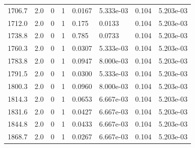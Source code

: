 \documentclass[preview]{standalone}
\begin{document}
{{{{{\begin{tabular}{L{1.2cm}C{1.2cm} C{0.3cm}C{0.5cm} C{1.4cm}C{1.4cm} C{1.4cm}C{1.4cm}}
  1706.7  &   2.0  & 0     &  1 &  0.0167  & 5.333e-03  & 0.104 &  5.203e-03   \\ 
  1712.0  &   2.0  & 0     &  1 &  0.175  & 0.0133  & 0.104 &  5.203e-03   \\ 
  1738.8  &   2.0  & 0     &  1 &  0.785  & 0.0733  & 0.104 &  5.203e-03   \\ 
  1760.3  &   2.0  & 0     &  1 &  0.0307  & 5.333e-03  & 0.104 &  5.203e-03   \\ 
  1783.8  &   2.0  & 0     &  1 &  0.0947  & 8.000e-03  & 0.104 &  5.203e-03   \\ 
  1791.5  &   2.0  & 0     &  1 &  0.0300  & 5.333e-03  & 0.104 &  5.203e-03   \\ 
  1800.3  &   2.0  & 0     &  1 &  0.0960  & 8.000e-03  & 0.104 &  5.203e-03   \\ 
  1814.3  &   2.0  & 0     &  1 &  0.0653  & 6.667e-03  & 0.104 &  5.203e-03   \\ 
  1831.6  &   2.0  & 0     &  1 &  0.0427  & 6.667e-03  & 0.104 &  5.203e-03   \\ 
  1844.8  &   2.0  & 0     &  1 &  0.0433  & 6.667e-03  & 0.104 &  5.203e-03   \\ 
  1868.7  &   2.0  & 0     &  1 &  0.0267  & 6.667e-03  & 0.104 &  5.203e-03   \\ 
\hline 
\end{tabular} 

}}}}}
\end{document}
